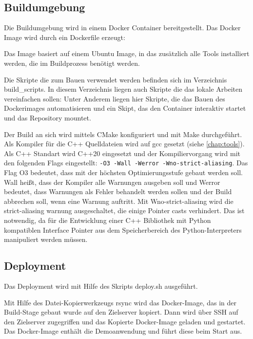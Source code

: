 

\subsection{Buildumgebung}
Die Buildumgebung wird in einem Docker Container bereitgestellt. Das Docker Image wird durch ein Dockerfile erzeugt:



Das Image basiert auf einem Ubuntu Image, in das zusätzlich alle Tools installiert werden, die im Buildprozess benötigt werden.

Die Skripte die zum Bauen verwendet werden befinden sich im Verzeichnis \glqq build\_scripts\grqq{}. In diesem Verzeichnis liegen auch Skripte die das lokale Arbeiten vereinfachen sollen: Unter Anderem liegen hier Skripte, die das Bauen des Dockerimages automatisieren und ein Skipt, das den Container interaktiv startet und das Repository mountet.

Der Build an sich wird mittels CMake konfiguriert und mit Make durchgeführt. Als Kompiler für die C++ Quelldateien wird auf gcc gesetzt (siehe \autoref{chap:tools}). Als C++ Standart wird C++20 eingesetzt und der Kompiliervorgang wird mit den folgenden Flags eingestellt: \lstinline{-O3 -Wall -Werror -Wno-strict-aliasing}. Das Flag O3 bedeutet, dass mit der höchsten Optimierungsstufe gebaut werden soll. Wall heißt, dass der Kompiler alle Warnungen ausgeben soll und Werror bedeutet, dass Warnungen als Fehler behandelt werden sollen und der Build abbrechen soll, wenn eine Warnung auftritt. Mit Wno-strict-aliasing wird die strict-aliasing warnung ausgeschaltet, die einige Pointer casts verhindert. Das ist notwendig, da für die Entwicklung einer C++ Bibliothek mit Python kompatiblen Interface Pointer aus dem Speicherbereich des Python-Interpreters manipuliert werden müssen.

\subsection{Deployment}

Das Deployment wird mit Hilfe des Skripts deploy.sh ausgeführt.



Mit Hilfe des Datei-Kopierwerkzeugs \glqq rsync\grqq{} wird das Docker-Image, das in der Build-Stage gebaut wurde auf den Zielserver kopiert. Dann wird über SSH auf den Zielserver zugegriffen und das Kopierte Docker-Image geladen und gestartet. Das Docker-Image enthält die Demoanwendung und führt diese beim Start aus.
